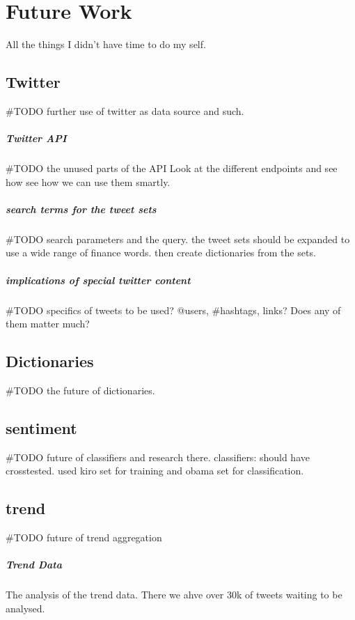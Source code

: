 \chapter{Future Work}\label{future_work}
All the things I didn't have time to do my self. 

\section{Twitter}
#TODO further use of twitter as data source and such.  

\paragraph{Twitter API}
#TODO the unused parts of the API
Look at the different endpoints and see how see how we can use them smartly.

\paragraph{search terms for the tweet sets}
#TODO search parameters and the query.
the tweet sets should be expanded to use a wide range of finance words. then
create dictionaries from the sets. 

\paragraph{implications of special twitter content}
#TODO specifics of tweets to be used?
@users, #hashtags, links? Does any of them matter much?

\section{Dictionaries}
#TODO the future of dictionaries.

\section{sentiment}
#TODO future of classifiers and research there.
classifiers:
should have crosstested. used kiro set for training and obama set for
classification.

\section{trend}
#TODO future of trend aggregation

\paragraph{Trend Data}
The analysis of the trend data. There we ahve over 30k of tweets waiting to be
analysed.

